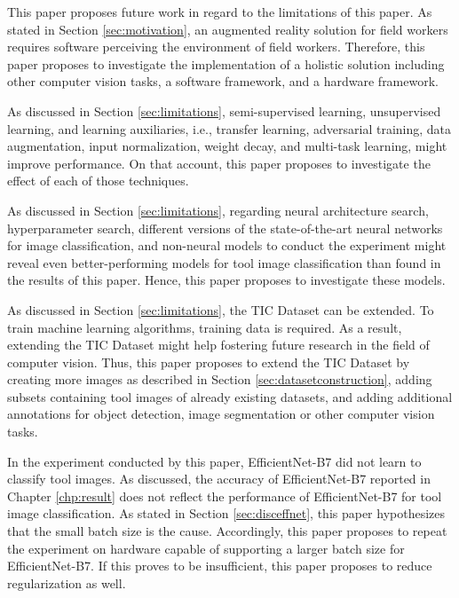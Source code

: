 This paper proposes future work in regard to the limitations of this paper. 
As stated in Section \ref{sec:motivation}, an augmented reality solution for field workers requires software perceiving the environment of field workers. Therefore, this paper proposes to investigate the implementation of a holistic solution including other computer vision tasks, a software framework, and a hardware framework.
\par %
As discussed in Section \ref{sec:limitations}, semi-supervised learning, unsupervised learning, and learning auxiliaries, i.e., transfer learning, adversarial training, data augmentation, input normalization, weight decay, and multi-task learning, might improve performance. On that account, this paper proposes to investigate the effect of each of those techniques.
\par %
As discussed in Section \ref{sec:limitations}, regarding  neural architecture search, hyperparameter search, different versions of the state-of-the-art neural networks for image classification, and non-neural models to conduct the experiment might reveal even better-performing models for tool image classification than found in the results of this paper. Hence, this paper proposes to investigate these models.
\par
As discussed in Section \ref{sec:limitations}, the \ac{TIC Dataset} can be extended. To train machine learning algorithms, training data is required. \autocite{ElAmir.2020} As a result, extending the \ac{TIC Dataset} might help fostering future research in the field of computer vision.
Thus, this paper proposes to extend the \ac{TIC Dataset} by creating more images as described in Section \ref{sec:datasetconstruction}, adding subsets containing tool images of already existing datasets, and adding additional annotations for object detection, image segmentation or other computer vision tasks.
\par
In the experiment conducted by this paper, EfficientNet-B7 did not learn to classify tool images. As discussed, the accuracy of EfficientNet-B7 reported in Chapter \ref{chp:result} does not reflect the performance of EfficientNet-B7 for tool image classification. As stated in Section \ref{sec:disceffnet}, this paper hypothesizes that the small batch size is the cause. Accordingly, this paper proposes to repeat the experiment on hardware capable of supporting a larger batch size for EfficientNet-B7. If this proves to be insufficient, this paper proposes to reduce regularization as well.